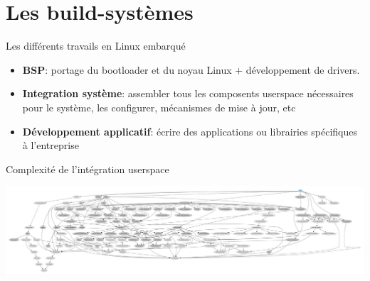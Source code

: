 \section{Les build-systèmes}

\begin{frame}{Les différents travails en Linux embarqué}
  \begin{itemize}
  \item {\bf BSP}: portage du bootloader et du noyau Linux + développement de drivers.
  \item {\bf Integration système}: assembler tous les composents userspace nécessaires pour le système, les configurer, mécanismes de mise à jour, etc
  \item {\bf Développement applicatif}: écrire des applications ou librairies spécifiques à l'entreprise
  \end{itemize}
\end{frame}

\begin{frame}{Complexité de l'intégration userspace}
  \begin{center}
    \includegraphics[width=\textwidth]{graphics/01_cours_magistral/graph-depends.pdf}
  \end{center}
\end{frame}

